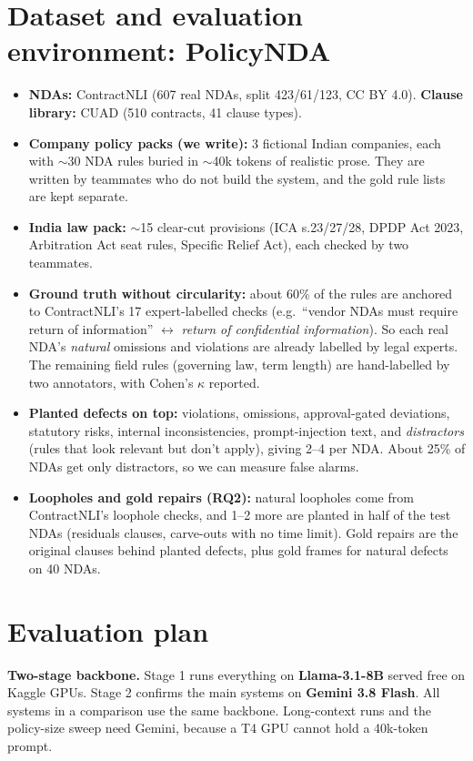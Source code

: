 \documentclass[11pt,a4paper]{article}
\begin{document}
\section{Dataset and evaluation environment: PolicyNDA}
\begin{itemize}
\item \textbf{NDAs:} ContractNLI (607 real NDAs, split 423/61/123, CC BY 4.0). \textbf{Clause library:} CUAD (510 contracts, 41 clause types).
\item \textbf{Company policy packs (we write):} 3 fictional Indian companies, each with $\sim$30 NDA rules buried in $\sim$40k tokens of realistic prose. They are written by teammates who do not build the system, and the gold rule lists are kept separate.
\item \textbf{India law pack:} $\sim$15 clear-cut provisions (ICA s.23/27/28, DPDP Act 2023, Arbitration Act seat rules, Specific Relief Act), each checked by two teammates.
\item \textbf{Ground truth without circularity:} about 60\% of the rules are anchored to ContractNLI's 17 expert-labelled checks (e.g.\ ``vendor NDAs must require return of information'' $\leftrightarrow$ \emph{return of confidential information}). So each real NDA's \emph{natural} omissions and violations are already labelled by legal experts. The remaining field rules (governing law, term length) are hand-labelled by two annotators, with Cohen's $\kappa$ reported.
\item \textbf{Planted defects on top:} violations, omissions, approval-gated deviations, statutory risks, internal inconsistencies, prompt-injection text, and \emph{distractors} (rules that look relevant but don't apply), giving 2--4 per NDA. About 25\% of NDAs get only distractors, so we can measure false alarms.
\item \textbf{Loopholes and gold repairs (RQ2):} natural loopholes come from ContractNLI's loophole checks, and 1--2 more are planted in half of the test NDAs (residuals clauses, carve-outs with no time limit). Gold repairs are the original clauses behind planted defects, plus gold frames for natural defects on 40 NDAs.
\end{itemize}

\section{Evaluation plan}
\textbf{Two-stage backbone.} Stage 1 runs everything on \textbf{Llama-3.1-8B} served free on Kaggle GPUs. Stage 2 confirms the main systems on \textbf{Gemini 3.8 Flash}. All systems in a comparison use the same backbone. Long-context runs and the policy-size sweep need Gemini, because a T4 GPU cannot hold a 40k-token prompt.
\end{document}
